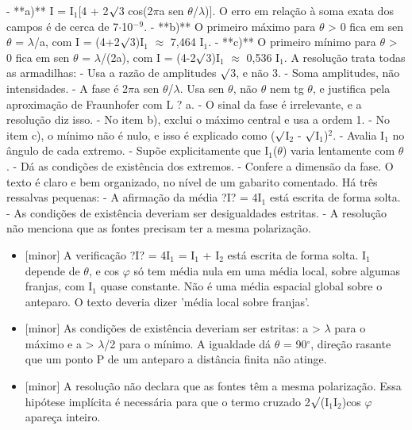 \documentclass{article}%
\begin{document}
{-} **a)** I = I$_{1}${[}4 + 2$\surd$3 cos(2$\pi$a sen $\theta$/$\lambda$){]}. O erro em relação à soma exata dos campos é de cerca de 7$\cdot$10$^{-}$$^{9}$.\newline%
{-} **b)** O primeiro máximo para $\theta$ > 0 fica em sen $\theta$ = $\lambda$/a, com I = (4+2$\surd$3)I$_{1}$ $\approx$ 7,464 I$_{1}$.\newline%
{-} **c)** O primeiro mínimo para $\theta$ > 0 fica em sen $\theta$ = $\lambda$/(2a), com I = (4-2$\surd$3)I$_{1}$ $\approx$ 0,536 I$_{1}$.\newline%
\newline%
A resolução trata todas as armadilhas:\newline%
{-} Usa a razão de amplitudes $\surd$3, e não 3.\newline%
{-} Soma amplitudes, não intensidades.\newline%
{-} A fase é 2$\pi$a sen $\theta$/$\lambda$. Usa sen $\theta$, não $\theta$ nem tg $\theta$, e justifica pela aproximação de Fraunhofer com L ? a.\newline%
{-} O sinal da fase é irrelevante, e a resolução diz isso.\newline%
{-} No item b), exclui o máximo central e usa a ordem 1.\newline%
{-} No item c), o mínimo não é nulo, e isso é explicado como ($\surd$I$_{2}$ - $\surd$I$_{1}$)$^2$.\newline%
{-} Avalia I$_{1}$ no ângulo de cada extremo.\newline%
{-} Supõe explicitamente que I$_{1}$($\theta$) varia lentamente com $\theta$.\newline%
{-} Dá as condições de existência dos extremos.\newline%
{-} Confere a dimensão da fase.\newline%
\newline%
O texto é claro e bem organizado, no nível de um gabarito comentado. Há três ressalvas pequenas:\newline%
{-} A afirmação da média ?I? = 4I$_{1}$ está escrita de forma solta.\newline%
{-} As condições de existência deveriam ser desigualdades estritas.\newline%
{-} A resolução não menciona que as fontes precisam ter a mesma polarização.%
\begin{itemize}%
\item%
{[}minor{]} A verificação ?I? = 4I$_{1}$ = I$_{1}$ + I$_{2}$ está escrita de forma solta. I$_{1}$ depende de $\theta$, e cos $\varphi$ só tem média nula em uma média local, sobre algumas franjas, com I$_{1}$ quase constante. Não é uma média espacial global sobre o anteparo. O texto deveria dizer 'média local sobre franjas'.%
\item%
{[}minor{]} As condições de existência deveriam ser estritas: a > $\lambda$ para o máximo e a > $\lambda$/2 para o mínimo. A igualdade dá $\theta$ = 90$^\circ$, direção rasante que um ponto P de um anteparo a distância finita não atinge.%
\item%
{[}minor{]} A resolução não declara que as fontes têm a mesma polarização. Essa hipótese implícita é necessária para que o termo cruzado 2$\surd$(I$_{1}$I$_{2}$)cos $\varphi$ apareça inteiro.%
\end{itemize}%
\end{document}
